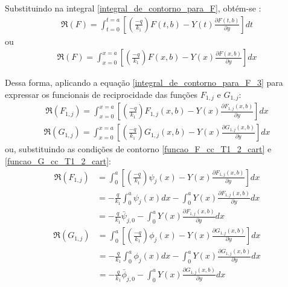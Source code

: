 Substituindo na integral \eqref{integral_de_contorno_para_F}, obtém-se \citep{livro_stewart_2}:
\begin{align}
\Re(F)
=
\int_{t=0}^{t=a} \left[\left(\frac{-q}{k_1}\right)F(t, b) - Y(t)\frac{\partial F(t, b)}{\partial y}\right] dt
\label{integral_de_contorno_para_F_2}
\end{align}
ou
\begin{align}
\Re(F)
=
\int_{x=0}^{x=a} \left[\left(\frac{-q}{k_1}\right)F(x, b) - Y(x)\frac{\partial F(x, b)}{\partial y}\right] dx
\label{integral_de_contorno_para_F_3}
\end{align}

Dessa forma, aplicando a equação \eqref{integral_de_contorno_para_F_3} para expressar os funcionais de reciprocidade das funções $F_{1,j}$ e $G_{1,j}$:
\begin{align}
\Re(F_{1,j})
=
\int_{x=0}^{x=a} \left[\left(\frac{-q}{k_1}\right)F_{1,j}(x, b) - Y(x)\frac{\partial F_{1,j}(x, b)}{\partial y}\right] dx
\label{integral_de_contorno_para_F1_0}
\end{align}
\begin{align}
\Re(G_{1,j})
=
\int_{x=0}^{x=a} \left[\left(\frac{-q}{k_1}\right)G_{1,j}(x, b) - Y(x)\frac{\partial G_{1,j}(x, b)}{\partial y}\right] dx
\label{integral_de_contorno_para_G1_0}
\end{align}
ou, substituindo as condições de contorno \eqref{funcao_F_cc_T1_2_cart} e \eqref{funcao_G_cc_T1_2_cart}:
\begin{align}
\Re(F_{1,j})
& =
\int_0^a \left[\left(\frac{-q}{k_1}\right)\psi_j(x) - Y(x)\frac{\partial F_{1,j}(x, b)}{\partial y}\right] dx \nonumber \\
& =
-\frac{q}{k_1}\int_0^a\psi_j(x)dx - \int_0^a Y(x)\frac{\partial F_{1,j}(x, b)}{\partial y} dx \nonumber \\
& =
-\frac{q}{k_1}\bar{\psi}_{j,0} - \int_0^a Y(x)\frac{\partial F_{1,j}(x, b)}{\partial y} dx
\label{integral_de_contorno_para_F1}
\end{align}
%
\begin{align}
\Re(G_{1,j})
& =
\int_0^a \left[\left(\frac{-q}{k_1}\right)\phi_j(x) - Y(x)\frac{\partial G_{1,j}(x, b)}{\partial y}\right] dx \nonumber \\
& =
-\frac{q}{k_1}\int_0^a\phi_j(x)dx - \int_0^a Y(x)\frac{\partial G_{1,j}(x, b)}{\partial y} dx
\nonumber \\
& =
-\frac{q}{k_1}\bar{\phi}_{j,0} - \int_0^a Y(x)\frac{\partial G_{1,j}(x, b)}{\partial y} dx
\label{integral_de_contorno_para_G1}
\end{align}


